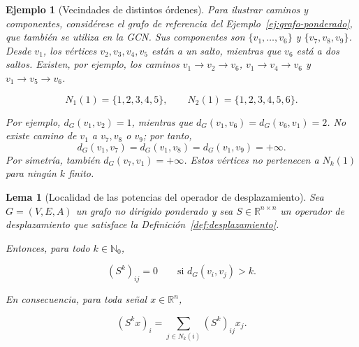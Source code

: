 \documentclass[a4paper,openany,oneside,10pt]{report}
\theoremstyle{pnlTeorema}
\newtheorem{lema}{Lema}[section]
\theoremstyle{pnlDefinicion}
\theoremstyle{pnlObservacion}
\newtheorem{ejemplo}{Ejemplo}[section]
\begin{document}
\begin{ejemplo}[Vecindades de distintos órdenes]\label{ej:vecindades}
Para ilustrar caminos y componentes, considérese el grafo de referencia del Ejemplo~\ref{ej:grafo-ponderado}, que también se utiliza en la GCN. Sus componentes son \(\{v_1,\ldots,v_6\}\) y \(\{v_7,v_8,v_9\}\). Desde \(v_1\), los vértices \(v_2,v_3,v_4,v_5\) están a un salto, mientras que \(v_6\) está a dos saltos. Existen, por ejemplo, los caminos \(v_1\to v_2\to v_6\), \(v_1\to v_4\to v_6\) y \(v_1\to v_5\to v_6\).

\[
N_1(1)=\{1,2,3,4,5\},\qquad N_2(1)=\{1,2,3,4,5,6\}.
\]

Por ejemplo, \(d_G(v_1,v_2)=1\), mientras que \(d_G(v_1,v_6)=d_G(v_6,v_1)=2\). No existe camino de \(v_1\) a \(v_7,v_8\) o \(v_9\); por tanto,
\[
d_G(v_1,v_7)=d_G(v_1,v_8)=d_G(v_1,v_9)=+\infty.
\]
Por simetría, también \(d_G(v_7,v_1)=+\infty\). Estos vértices no pertenecen a \(N_k(1)\) para ningún \(k\) finito.
\end{ejemplo}


\begin{lema}[Localidad de las potencias del operador de desplazamiento]\label{lem:localidad-potencias}
Sea \(G=(V,E,A)\) un grafo no dirigido ponderado y sea \(S\in\mathbb R^{n\times n}\) un operador de desplazamiento que satisface la Definición~\ref{def:desplazamiento}.

Entonces, para todo \(k\in\mathbb N_0\),

\[
(S^k)_{ij}=0
\qquad\text{si }d_G(v_i,v_j)>k.
\]

En consecuencia, para toda señal \(x\in\mathbb R^n\),

\[
(S^kx)_i=
\sum_{j\in N_k(i)}(S^k)_{ij}x_j.
\]

\end{lema}
\end{document}

